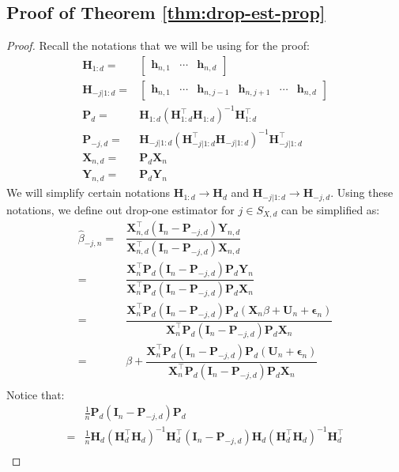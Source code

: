 \documentclass[
  12pt]{article}
\newcommand{\bX}{\boldsymbol{X}}
\newcommand{\bY}{\boldsymbol{Y}}
\newcommand{\bh}{\boldsymbol{h}}
\newcommand{\bU}{\boldsymbol{U}}
\newcommand{\bP}{\boldsymbol{P}}
\newcommand{\bI}{\boldsymbol{I}}
\newcommand{\beps}{\boldsymbol{\epsilon}}
\newcommand{\bH}{\boldsymbol{H}}
\begin{document}
\subsection{Proof of Theorem \ref{thm:drop-est-prop}}\label{thm:drop-est-prop-proof}
\begin{proof}
    Recall the notations that we will be using for the proof:
    $$
    \begin{aligned}
        \bH_{1:d} = &\begin{bmatrix}
    \bh_{n,1} & \cdots & \bh_{n,d}
\end{bmatrix} \\
        \bH_{-j|1:d} = &
\begin{bmatrix}
    \bh_{n,1} & \cdots & \bh_{n,j-1} & \bh_{n,j+1} & \cdots & \bh_{n,d}
\end{bmatrix} \\
\bP_{d} = & \bH_{1:d}\left(\bH_{1:d}^\top\bH_{1:d}\right)^{-1}\bH_{1:d}^\top\\
\bP_{-j,d} = & \bH_{-j|1:d}\left(\bH_{-j|1:d}^\top\bH_{-j|1:d}\right)^{-1}\bH_{-j|1:d}^\top\\
\bX_{n,d} = & \bP_d\bX_n\\
\bY_{n,d} = & \bP_d\bY_n
    \end{aligned}
    $$
    We will simplify certain notations $\bH_{1:d} \to \bH_d$ and $\bH_{-j|1:d} \to \bH_{-j,d}$.
    Using these notations, we define out drop-one estimator for $j \in S_{X,d}$ can be simplified as:
    $$
    \begin{aligned}
            \hat{\beta}_{-j,n} = & \dfrac{\bX_{n,d}^\top(\bI_n - \bP_{-j,d})\bY_{n,d}}{\bX_{n,d}^\top(\bI_n - \bP_{-j,d})\bX_{n,d}}\\
            = & \dfrac{\bX_{n}^\top\bP_d(\bI_n - \bP_{-j,d})\bP_d\bY_{n}}{\bX_{n}^\top\bP_d(\bI_n - \bP_{-j,d})\bP_d\bX_{n}}\\
            = & \dfrac{\bX_{n}^\top\bP_d(\bI_n - \bP_{-j,d})\bP_d(\bX_n\beta + \bU_n + \beps_n)}{\bX_{n}^\top\bP_d(\bI_n - \bP_{-j,d})\bP_d\bX_{n}}\\
            = & \beta + \dfrac{\bX_{n}^\top\bP_d(\bI_n - \bP_{-j,d})\bP_d(\bU_n + \beps_n)}{\bX_{n}^\top\bP_d(\bI_n - \bP_{-j,d})\bP_d\bX_{n}}\\
    \end{aligned}
    $$
Notice that:
\begin{equation}\label{eq:proj-simplify}
    \begin{split}
        & \frac{1}{n}\bP_d(\bI_n - \bP_{-j,d})\bP_d\\
        = & \frac{1}{n}\bH_{d}\left(\bH_{d}^\top\bH_{d}\right)^{-1}\bH_{d}^\top(\bI_n - \bP_{-j,d})\bH_{d}\left(\bH_{d}^\top\bH_{d}\right)^{-1}\bH_{d}^\top\\

\end{split}
\end{equation}
\end{proof}
\end{document}
